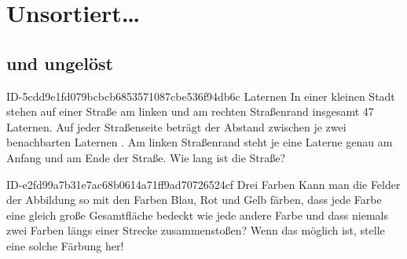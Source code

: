 \allowdisplaybreaks
\setcounter{chapter}{-1}
\chapter{Unsortiert\ldots}

\section{und ungelöst}

\begin{exercise}
      {ID-5cdd9e1fd079bcbcb6853571087cbe536f94db6c}
      {Laternen}
  \ifproblem\problem
    In einer kleinen Stadt stehen auf einer Straße am linken und am rechten
    Straßenrand insgesamt 47 Laternen.
    Auf jeder Straßenseite beträgt der Abstand zwischen je zwei benachbarten
    Laternen .
    Am linken Straßenrand steht je eine Laterne genau am Anfang und am Ende
    der Straße.
    Wie lang ist die Straße?
  \fi
\end{exercise}

\begin{exercise}
      {ID-e2fd99a7b31e7ac68b0614a71ff9ad70726524cf}
      {Drei Farben}
  \ifproblem\problem
    Kann man die Felder der Abbildung so mit den Farben Blau, Rot und Gelb
    färben, dass jede Farbe eine gleich große Gesamtfläche bedeckt wie jede
    andere Farbe und dass niemals zwei Farben längs einer Strecke zusammenstoßen?
    Wenn das möglich ist, stelle eine solche Färbung her!
    \begin{center}
    \end{center}
  \fi
\end{exercise}

